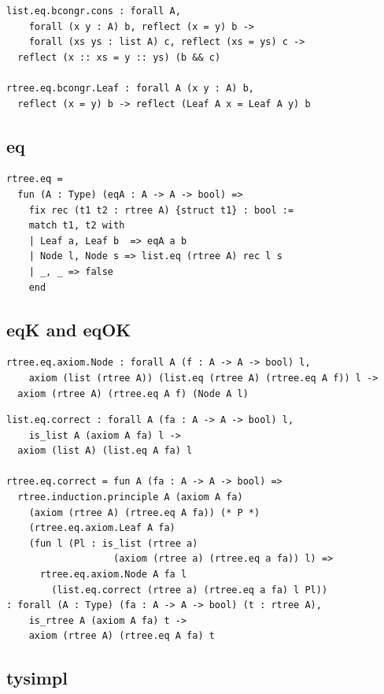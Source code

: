 \documentclass[sigplan,10pt,review]{acmart}\settopmatter{printfolios=true,printccs=false,printacmref=false}
\begin{document}
\begin{lstlisting}
list.eq.bcongr.cons : forall A,
    forall (x y : A) b, reflect (x = y) b ->
    forall (xs ys : list A) c, reflect (xs = ys) c ->
  reflect (x :: xs = y :: ys) (b && c)

rtree.eq.bcongr.Leaf : forall A (x y : A) b,
  reflect (x = y) b -> reflect (Leaf A x = Leaf A y) b
\end{lstlisting}

\subsection{eq} %

\begin{lstlisting}
rtree.eq = 
  fun (A : Type) (eqA : A -> A -> bool) =>
    fix rec (t1 t2 : rtree A) {struct t1} : bool :=
    match t1, t2 with
    | Leaf a, Leaf b  => eqA a b
    | Node l, Node s => list.eq (rtree A) rec l s
    | _, _ => false
    end
\end{lstlisting}

\subsection{eqK and eqOK} %

\begin{lstlisting}
rtree.eq.axiom.Node : forall A (f : A -> A -> bool) l,
    axiom (list (rtree A)) (list.eq (rtree A) (rtree.eq A f)) l ->
  axiom (rtree A) (rtree.eq A f) (Node A l)
\end{lstlisting}

\begin{lstlisting}
list.eq.correct : forall A (fa : A -> A -> bool) l,
    is_list A (axiom A fa) l ->
  axiom (list A) (list.eq A fa) l
       
rtree.eq.correct = fun A (fa : A -> A -> bool) =>
  rtree.induction.principle A (axiom A fa)
    (axiom (rtree A) (rtree.eq A fa)) (* P *)
    (rtree.eq.axiom.Leaf A fa)
    (fun l (Pl : is_list (rtree a)
                   (axiom (rtree a) (rtree.eq a fa)) l) =>
      rtree.eq.axiom.Node A fa l
        (list.eq.correct (rtree a) (rtree.eq a fa) l Pl))
: forall (A : Type) (fa : A -> A -> bool) (t : rtree A),
    is_rtree A (axiom A fa) t ->
    axiom (rtree A) (rtree.eq A fa) t
\end{lstlisting}

\subsection{tysimpl} %
\end{document}
